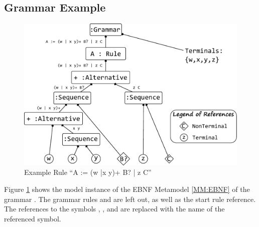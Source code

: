 \subsection{Grammar Example}
\begin{figure}
\centering
\includegraphics[scale=0.7]{gfx/ex/grammarExample} 
\caption{Example Rule ``A := (w |x y)+ B? | z C''}
\label{MM:GrammarExample}
\end{figure}
Figure \ref{MM:GrammarExample} shows the model instance of the EBNF Metamodel \ref{MM:EBNF} of the grammar  . The grammar rules  and  are left out, as well as the start rule reference. The references to the symbols , ,  and  are replaced with the name of the referenced symbol.

